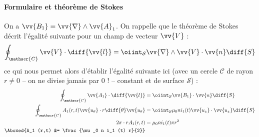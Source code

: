 \paragraph*{Formulaire et théorème de Stokes} On a $\vv{B_1} = \vv{\nabla} \wedge \vv{A}_1$. On rappelle que le théorème de Stokes décrit l'égalité suivante pour un champ de vecteur $\vv{V}$ :
\begin{equation}
  \oint_\mathscr{C} \vv{V} \cdot \diff{\vv{l}} = \oiint_\mathcal{S} \vv{\nabla} \wedge \vv{V} \cdot \vv{n} \diff{S}
\end{equation}
ce qui nous permet alors d'établir l'égalité suivante ici (avec un cercle $\mathscr{C}$ de rayon $r \neq 0$ -- on ne divise jamais par 0 ! -- constant et de surface $\mathcal{S}$) :
\begin{equation}
  \begin{split}
    \oint_\mathscr{C} \vv{A_1} \cdot \diff{\vv{l}} &= \oiint_\mathcal{S} \vv{B_1} \cdot \vv{n} \diff{S}\\
    \oint_\mathscr{C} A_1 (r,t) \vv{u_\theta} \cdot r \diff{\theta} \vv{u_\theta} &= \oiint_\mathcal{S} \mu_0 n i_1(t) \vv{u_z} \cdot \vv{u_z} \diff{S}\\
    2 \pi \cdot r A_1 (r,t) &= \mu_0 n i_1 (t) \pi r^2\\
    \Aboxed{A_1 (r,t) &= \frac{\mu_0 n i_1 (t) r}{2}}
  \end{split}
\end{equation}



